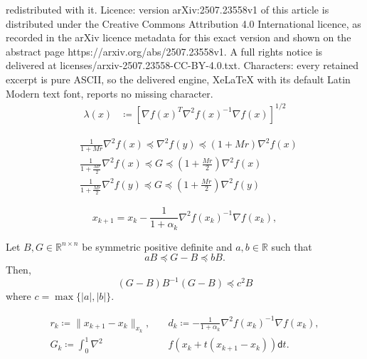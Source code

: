 \documentclass[10pt,a4paper]{amsart}
\newcommand{\R}{\mathbb{R}}
\renewcommand{\d}{\mathsf{d}}
\begin{document}
redistributed with it. Licence: version arXiv:2507.23558v1 of this article is distributed under the Creative Commons Attribution 4.0 International licence, as recorded in the arXiv licence metadata for this exact version and shown on the abstract page https://arxiv.org/abs/2507.23558v1. A full rights notice is delivered at licenses/arxiv-2507.23558-CC-BY-4.0.txt. Characters: every retained excerpt is pure ASCII, so the delivered engine, XeLaTeX with its default Latin Modern text font, reports no missing character.
\begin{align}
    \lambda(x) & \coloneq \left[\nabla f(x)^T \nabla^2 f(x)^{-1} \nabla f(x)\right]^{1/2} \label{eq: newton decrement}
\end{align}

    \begin{align}
        & \frac{1}{1+ Mr} \nabla^2f(x) \preceq \nabla^2f(y) \preceq \left( 1+ Mr \right) \nabla^2f(x) \label{ineq: hessian comparison x_k x_k+1} \\
        & \frac{1}{1+ \frac{Mr}{2}} \nabla^2f(x) \preceq G \preceq \left( 1+ \frac{Mr}{2} \right) \nabla^2f(x) \label{ineq: average hessian for x_k} \\
        & \frac{1}{1+ \frac{Mr}{2}} \nabla^2f(y) \preceq G \preceq \left( 1+ \frac{Mr}{2} \right) \nabla^2f(y) \label{ineq: average hessian for x_k+1}
    \end{align}    

\begin{equation} \label{eq: damped newton}
    x_{k+1} = x_k - \frac{1}{1 + \alpha_k} \nabla^2 f (x_k)^{-1} \nabla f (x_k),
\end{equation}

\begin{lemma} \label{lemma: quadratic form bound on matrices}
Let $B, G \in \R^{n \times n}$ be symmetric positive definite and $a, b \in \R$ such that
\begin{equation} \label{ineq: ass in lemma appendix}
     a B \preceq G - B \preceq b B.
\end{equation}
Then,
\begin{equation} \label{ineq: quadratic form bound on matrices}
    \left( G - B\right) B^{-1} \left( G - B\right) \preceq c^2 B
\end{equation}
where $c = \max\{|a|, |b| \}$.
\end{lemma}

\begin{equation} \label{eq: def r_k, d_k}
\begin{split}
    r_k \coloneq \|x_{k+1} - x_{k} \|_{x_{k}}, \quad & d_k \coloneq - \frac{1}{1+ \alpha_k} \nabla^2 f(x_{k})^{-1} \nabla f(x_{k}), \\ 
    G_k \coloneq \int_0^1 \nabla^2 & f (x_k  + t (x_{k+1} - x_k)) \d t.
\end{split}
\end{equation}
\end{document}
